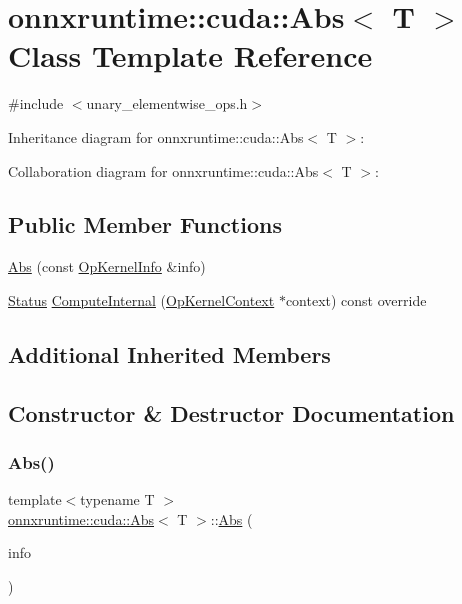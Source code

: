 \hypertarget{classonnxruntime_1_1cuda_1_1Abs}{}\section{onnxruntime\+:\+:cuda\+:\+:Abs$<$ T $>$ Class Template Reference}
\label{classonnxruntime_1_1cuda_1_1Abs}


{\ttfamily \#include $<$unary\+\_\+elementwise\+\_\+ops.\+h$>$}



Inheritance diagram for onnxruntime\+:\+:cuda\+:\+:Abs$<$ T $>$\+:


Collaboration diagram for onnxruntime\+:\+:cuda\+:\+:Abs$<$ T $>$\+:
\subsection*{Public Member Functions}
\begin{DoxyCompactItemize}
\item 
\mbox{\hyperlink{classonnxruntime_1_1cuda_1_1Abs_a08fb6d060c523ca5f5be39140ce542a1}{Abs}} (const \mbox{\hyperlink{classonnxruntime_1_1OpKernelInfo}{Op\+Kernel\+Info}} \&info)
\item 
\mbox{\hyperlink{classonnxruntime_1_1common_1_1Status}{Status}} \mbox{\hyperlink{classonnxruntime_1_1cuda_1_1Abs_a1bf2979c1a4933cd6155c2952c1dc772}{Compute\+Internal}} (\mbox{\hyperlink{classonnxruntime_1_1OpKernelContext}{Op\+Kernel\+Context}} $\ast$context) const override
\end{DoxyCompactItemize}
\subsection*{Additional Inherited Members}


\subsection{Constructor \& Destructor Documentation}
\mbox{\label{classonnxruntime_1_1cuda_1_1Abs_a08fb6d060c523ca5f5be39140ce542a1}} 
\subsubsection{\texorpdfstring{Abs()}{Abs()}}
{\footnotesize\ttfamily template$<$typename T $>$ \\
\mbox{\hyperlink{classonnxruntime_1_1cuda_1_1Abs}{onnxruntime\+::cuda\+::\+Abs}}$<$ T $>$\+::\mbox{\hyperlink{classonnxruntime_1_1cuda_1_1Abs}{Abs}} (\begin{DoxyParamCaption}\item[{const \mbox{\hyperlink{classonnxruntime_1_1OpKernelInfo}{Op\+Kernel\+Info}} \&}]{info }\end{DoxyParamCaption})\hspace{0.3cm}{\ttfamily [inline]}}



